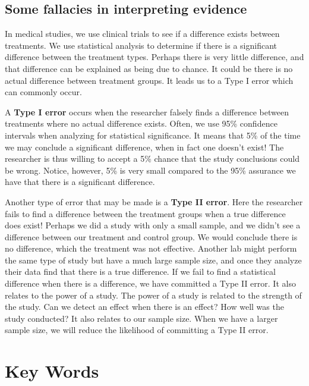 \documentclass[11pt]{book}\usepackage[]{graphicx}\usepackage[]{color}
\begin{document}
\subsection{Some fallacies in interpreting evidence} 

In medical studies, we use clinical trials to see if a difference exists between treatments.  We use statistical analysis to determine if there is a significant difference between the treatment types.  Perhaps there is very little difference, and that difference can be explained as being due to chance.  It could be there is no actual difference between treatment groups.  It leads us to a Type I error which can commonly occur.

A \textbf{Type I error} occurs when the researcher falsely finds a difference between treatments where no actual difference exists.  Often, we use 95\% confidence intervals when analyzing for statistical significance.  It means that 5\% of the time we may conclude a significant difference, when in fact one doesn’t exist!  The researcher is thus willing to accept a 5\% chance that the study conclusions could be wrong.  Notice, however, 5\% is very small compared to the 95\% assurance we have that there is a significant difference.

Another type of error that may be made is a \textbf{Type II error}.  Here the researcher fails to find a difference between the treatment groups when a true difference does exist!  Perhaps we did a study with only a small sample, and we didn't see a difference between our treatment and control group.  We would conclude there is no difference, which the treatment was not effective.  Another lab might perform the same type of study but have a much large sample size, and once they analyze their data find that there is a true difference.  If we fail to find a statistical difference when there is a difference, we have committed a Type II error.  It also relates to the power of a study.  The power of a study is related to the strength of the study.  Can we detect an effect when there is an effect?  How well was the study conducted?  It also relates to our sample size.  When we have a larger sample size, we will reduce the likelihood of committing a Type II error.

\section{Key Words}
\end{document}
